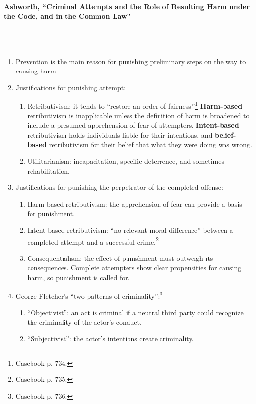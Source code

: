 \paragraph{Ashworth, ``Criminal Attempts and the Role of Resulting Harm under 
the Code, and in the Common Law''}
~\\\\
\begin{enumerate}
    \item Prevention is the main reason for punishing preliminary steps on the 
    way to causing harm.
    \item Justifications for punishing attempt:
    \begin{enumerate}
        \item Retributivism: it tends to ``restore an order of 
        fairness.''\footnote{Casebook p. 734.} \textbf{Harm-based} 
        retributivism is inapplicable unless the definition of harm is 
        broadened to include a presumed apprehension of fear of attempters.  
        \textbf{Intent-based} retributivism holds individuals liable for their 
        intentions, and \textbf{belief-based} retributivism for their belief 
        that what they were doing was wrong.
        \item Utilitarianism: incapacitation, specific deterrence, and 
        sometimes rehabilitation.
    \end{enumerate}
    \item Justifications for punishing the perpetrator of the completed 
    offense:
    \begin{enumerate}
        \item Harm-based retributivism: the apprehension of fear can provide a 
        basis for punishment.
        \item Intent-based retributivism: ``no relevant moral difference'' 
        between a completed attempt and a successful crime.\footnote{Casebook 
        p.  735.}
        \item Consequentialism: the effect of punishment must outweigh its 
        consequences. Complete attempters show clear propensities for causing 
        harm, so punishment is called for.
    \end{enumerate}
    \item George Fletcher's ``two patterns of criminality'':\footnote{Casebook 
    p. 736.}
    \begin{enumerate}
        \item ``Objectivist'': an act is criminal if a neutral third party 
        could recognize the criminality of the actor's conduct.
        \item ``Subjectivist'': the actor's intentions create criminality.
    \end{enumerate}
\end{enumerate}

